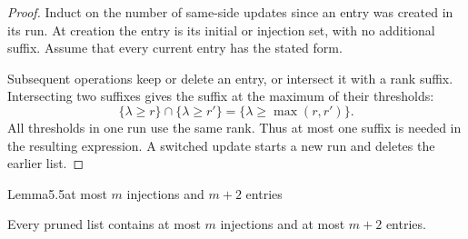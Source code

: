 \begin{proof}
Induct on the number of same-side updates since an entry was created in its run. At creation the entry is its initial or injection set, with no additional suffix. Assume that every current entry has the stated form.

Subsequent operations keep or delete an entry, or intersect it with a rank suffix. Intersecting two suffixes gives the suffix at the maximum of their thresholds: \[
\{\lambda\geq r\}\cap\{\lambda\geq r'\}
=\{\lambda\geq\max(r,r')\}.
\] All thresholds in one run use the same rank. Thus at most one suffix is needed in the resulting expression. A switched update starts a new run and deletes the earlier list.
\end{proof}

\begin{numbered}{Lemma}{5.5}{at most \(m\) injections and \(m+2\) entries}

Every pruned list contains at most \(m\) injections and at most \(m+2\) entries.

\end{numbered}

